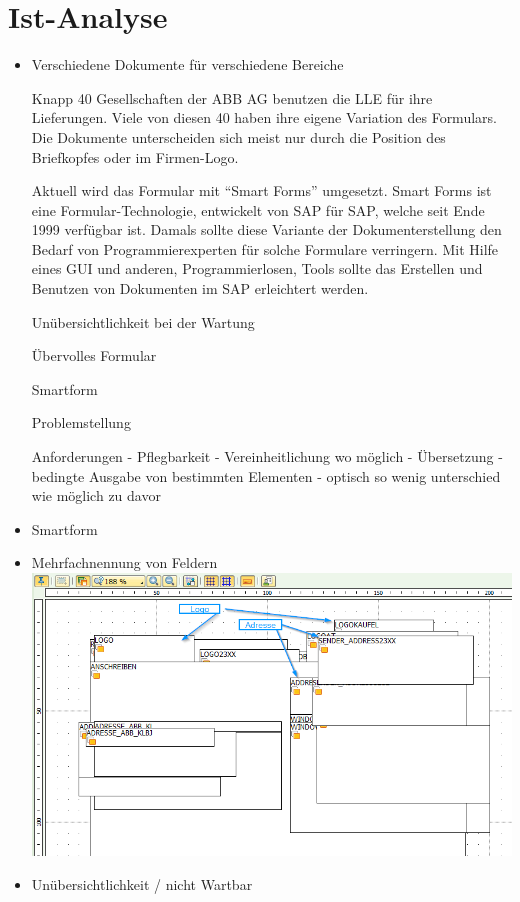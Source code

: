 \chapter{Ist-Analyse}
\label{ch:Ist-Analyse}

\begin{itemize}
	
	\item Verschiedene Dokumente für verschiedene Bereiche
	
	Knapp 40 Gesellschaften der ABB AG benutzen die \ac{LLE} für ihre Lieferungen. Viele von diesen 40 haben ihre eigene Variation des Formulars. Die Dokumente unterscheiden sich meist nur durch die Position des Briefkopfes oder im Firmen-Logo. 
	
	Aktuell wird das Formular mit "`Smart Forms"' umgesetzt. Smart Forms ist eine Formular-Technologie, entwickelt von SAP für SAP, welche seit Ende 1999 verfügbar ist. Damals sollte diese Variante der Dokumenterstellung den Bedarf von Programmierexperten für solche Formulare verringern. Mit Hilfe eines \ac{GUI} und anderen, Programmierlosen, Tools sollte das Erstellen und Benutzen von Dokumenten im SAP erleichtert werden.  
	
	
	Unübersichtlichkeit bei der Wartung
	
	Übervolles Formular
	
	Smartform
	
	Problemstellung
	
	Anforderungen
		- Pflegbarkeit
		- Vereinheitlichung wo möglich
		- Übersetzung
		- bedingte Ausgabe von bestimmten Elementen
		- optisch so wenig unterschied wie möglich zu davor
	
	
	\item Smartform
	\item Mehrfachnennung von Feldern \\
	
	\includegraphics[width=0.65\paperwidth, height=0.4\paperheight]{img/Smartform-Beispiel-1.png}
	\item Unübersichtlichkeit / nicht Wartbar 
\end{itemize}